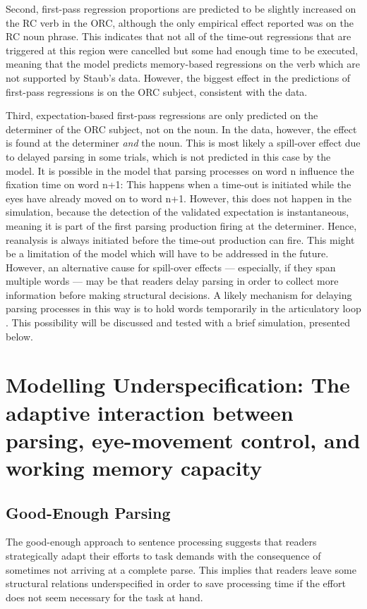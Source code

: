 \documentclass{cambridge7A}\usepackage[]{graphicx}\usepackage[]{color}
\begin{document}
Second,  first-pass regression proportions are predicted to be slightly increased on the RC verb in the ORC, although the only empirical effect reported was on the RC noun phrase. This indicates that not all of the time-out regressions that are triggered at this region were cancelled but some had enough time to be executed, meaning that the model predicts memory-based regressions on the verb which are not supported by Staub's data. However, the biggest effect in the predictions of first-pass regressions is on the ORC subject, consistent with the data.

Third, expectation-based first-pass regressions are only predicted on the determiner of the ORC subject, not on the noun. In the data, however, the effect is found at the determiner \emph{and} the noun. This is most likely a spill-over effect due to delayed parsing in some trials, which is not predicted in this case by the model. It is possible in the model that parsing processes on word n influence the fixation time on word n+1: This happens when a time-out is initiated while the eyes have already moved on to word n+1. However, this does not happen in the simulation, because the detection of the validated expectation is instantaneous, meaning it is part of the first parsing production firing at the determiner. Hence, reanalysis is always initiated before the time-out production can fire. This might be a limitation of the model which will have to be addressed in the future. However, an alternative cause for spill-over effects --- especially, if they span multiple words --- may be that readers delay parsing in order to collect more information before making structural decisions.
A likely mechanism for delaying parsing processes in this way is to hold words temporarily in the articulatory loop \citep{BaddeleyHitch1974,Baddeley2003}. This possibility will be discussed and tested with a brief simulation, presented below. 

\section[Modelling Underspecification]{Modelling Underspecification: The adaptive interaction between parsing, eye-movement control, and working memory capacity}
\label{sec:sim:III}
\subsection{Good-Enough Parsing}
The good-enough approach to sentence processing \citep{FerreiraFerraroBailey2002,SanfordSturt2002} suggests that readers strategically adapt their efforts to task demands with the consequence of sometimes not arriving at a complete parse. 
This implies that readers leave some structural relations underspecified in order to save processing time if the effort does not seem necessary for the task at hand.
\end{document}
